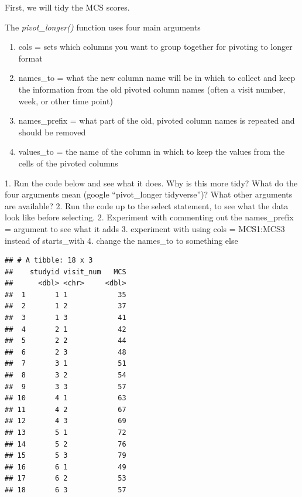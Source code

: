\documentclass[
]{book}
\newenvironment{Shaded}{\begin{snugshade}}{\end{snugshade}}
\newcommand{\DataTypeTok}[1]{\textcolor[rgb]{0.13,0.29,0.53}{#1}}
\newcommand{\KeywordTok}[1]{\textcolor[rgb]{0.13,0.29,0.53}{\textbf{#1}}}
\newcommand{\NormalTok}[1]{#1}
\newcommand{\OperatorTok}[1]{\textcolor[rgb]{0.81,0.36,0.00}{\textbf{#1}}}
\newcommand{\StringTok}[1]{\textcolor[rgb]{0.31,0.60,0.02}{#1}}
\providecommand{\tightlist}{%
  \setlength{\itemsep}{0pt}\setlength{\parskip}{0pt}}
\begin{document}
First, we will tidy the MCS scores.

The \emph{pivot\_longer()} function uses four main arguments

\begin{enumerate}
\def\labelenumi{\arabic{enumi}.}
\tightlist
\item
  cols = sets which columns you want to group together for pivoting to longer format
\item
  names\_to = what the new column name will be in which to collect and keep the information from the old pivoted column names (often a visit number, week, or other time point)
\item
  names\_prefix = what part of the old, pivoted column names is repeated and should be removed
\item
  values\_to = the name of the column in which to keep the values from the cells of the pivoted columns
\end{enumerate}

1. Run the code below and see what it does.
Why is this more tidy?
What do the four arguments mean (google ``pivot\_longer tidyverse'')?
What other arguments are available?
2. Run the code up to the select statement, to see what the data look like before selecting.
2. Experiment with commenting out the names\_prefix =
argument to see what it adds
3. experiment with using cols = MCS1:MCS3 instead of starts\_with
4. change the names\_to to something else

\begin{Shaded}
\end{Shaded}

\begin{verbatim}
## # A tibble: 18 x 3
##    studyid visit_num   MCS
##      <dbl> <chr>     <dbl>
##  1       1 1            35
##  2       1 2            37
##  3       1 3            41
##  4       2 1            42
##  5       2 2            44
##  6       2 3            48
##  7       3 1            51
##  8       3 2            54
##  9       3 3            57
## 10       4 1            63
## 11       4 2            67
## 12       4 3            69
## 13       5 1            72
## 14       5 2            76
## 15       5 3            79
## 16       6 1            49
## 17       6 2            53
## 18       6 3            57
\end{verbatim}
\end{document}
